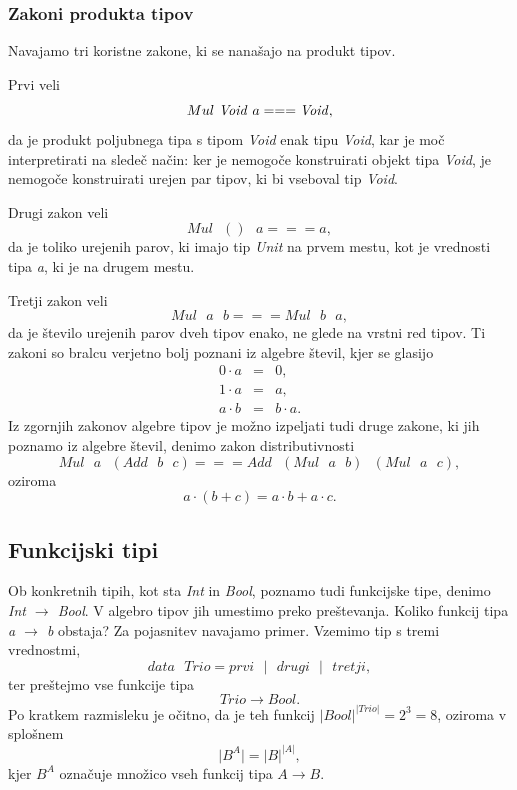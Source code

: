 \documentclass[a4paper, 12pt]{book}
\begin{document}
\subsubsection{Zakoni produkta tipov}

Navajamo tri koristne zakone, ki se nanašajo na produkt tipov. 

\noindent Prvi veli
$$Mul\text{ \emph{Void}}\text{ }a===\text{\emph{Void}},$$
da je produkt poljubnega tipa s tipom \emph{Void} enak tipu \emph{Void}, kar je moč interpretirati na sledeč način: ker je nemogoče konstruirati objekt tipa \emph{Void}, je nemogoče konstruirati urejen par tipov, ki bi vseboval tip \emph{Void}. 

\noindent Drugi zakon veli
$$Mul\text{ }()\text{ }a===a,$$
da je toliko urejenih parov, ki imajo tip \emph{Unit} na prvem mestu, kot je vrednosti tipa \emph{a}, ki je na drugem mestu.

\noindent Tretji zakon veli
$$Mul\text{ }a\text{ }b===Mul\text{ }b\text{ }a,$$
da je število urejenih parov dveh tipov enako, ne glede na vrstni red tipov. Ti zakoni so bralcu verjetno bolj poznani iz algebre števil, kjer se glasijo
\begin{eqnarray}
0\cdot a&=&0,\\
1\cdot a&=&a,\\
a\cdot b&=&b\cdot a.
\end{eqnarray}
Iz zgornjih zakonov algebre tipov je možno izpeljati tudi druge zakone, ki jih poznamo iz algebre števil, denimo zakon distributivnosti
$$Mul\text{ }a\text{ }(Add\text{ }b\text{ }c)===Add\text{ }(Mul\text{ }a\text{ }b)\text{ }(Mul\text{ }a\text{ }c),$$
oziroma
$$a\cdot(b+c)=a\cdot b+a\cdot c.$$

\subsection{Funkcijski tipi}

Ob konkretnih tipih, kot sta \emph{Int} in \emph{Bool}, poznamo tudi funkcijske tipe, denimo \emph{Int $\to$ Bool}. V algebro tipov jih umestimo preko preštevanja. Koliko funkcij tipa \emph{a $\to$ b} obstaja? Za pojasnitev navajamo primer. Vzemimo tip s tremi vrednostmi,
$$data\text{ }Trio=prvi\text{ }\vert\text{ } drugi\text{ }\vert\text{ } tretji,$$
ter preštejmo vse funkcije tipa
$$Trio\to Bool.$$
Po kratkem razmisleku je očitno, da je teh funkcij $\vert Bool\vert^{\vert Trio\vert}=2^3=8$, oziroma v splošnem
$$\vert B^A\vert=\vert B\vert^{\vert A\vert},$$
kjer $B^A$ označuje množico vseh funkcij tipa $A\to B$.
\end{document}
